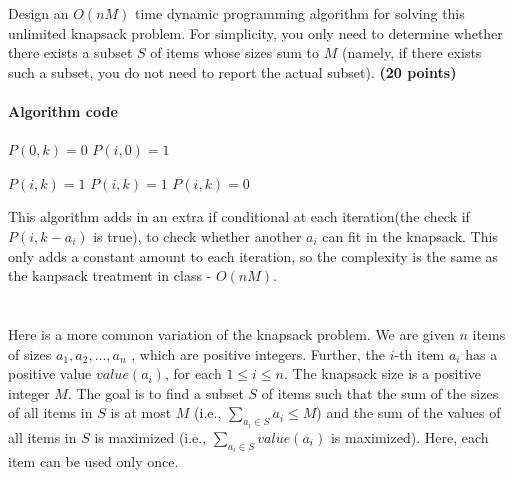 \documentclass{article}
\begin{document}
Design an $O(nM)$ time dynamic programming algorithm for solving this
unlimited knapsack problem. For simplicity, you only need to determine
whether there exists a subset $S$ of items whose sizes sum to $M$
(namely, if there exists such a subset, you do not need to report the 
actual subset). {\bf (20 points)}



\paragraph{Algorithm code}

{\singlespacing
\begin{algorithmic}
      \State $P(0,k) = 0$
    \EndFor
      \State $P(i,0) = 1$
    \EndFor
    
           \State $P(i,k) = 1$
        \Else
            \State $P(i,k) = 1$
          \Else
            \State $P(i,k) = 0$
          \EndIf
        \EndIf  

      \EndFor
    \EndFor
    
\EndFunction    
\end{algorithmic}
}

This algorithm adds in an extra if conditional at each iteration(the
check if $P(i,k-a_i)$ is true), to
check whether another $a_i$ can fit in the knapsack.  This only adds a
constant amount to each iteration, so the complexity is the same as
the kanpsack treatment in class - $O(nM)$.



\section{}
Here is a more common variation of the knapsack problem. We are given
$n$ items of sizes $a_1 ,a_2 ,\dots,a_n$ , which are positive
integers. Further, the $i$-th item $a_i$ has a positive value
$value(a_i )$, for each $1 \le i \le n$. The knapsack size is a
positive integer $M$. The goal is to  find a subset $S$ of items such
that the sum of the sizes of all items in $S$ is at most $M$ (i.e.,
$\sum_{ a_i \in S} a_i \le M$) and the sum of the values of all items
in $S$ is maximized (i.e., $\sum_{a_i \in S} value(a_i )$ is
maximized). Here, each item can be used only once. 
\end{document}
